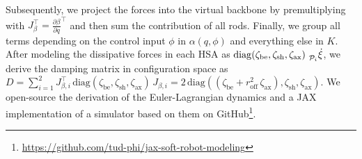 Subsequently, we project the forces into the virtual backbone by premultiplying with $J_\beta^\top = \frac{\partial \beta}{\partial q}^\top$ and then sum the contribution of all rods.
Finally, we group all terms depending on the control input $\phi$ in $\alpha(q,\phi)$ and everything else in $K$.
After modeling the dissipative forces in each \gls{HSA} as $\mathrm{diag}(\zeta_\mathrm{be}, \zeta_{\mathrm{sh}}, \zeta_{\mathrm{ax}}) \, \prescript{}{\mathcal{P}_i}{\dot{\xi}}$, we derive the damping matrix in configuration space as $D = \sum_{i=1}^{2} J_{\beta,i}^\top \, \mathrm{diag}(\zeta_\mathrm{be}, \zeta_{\mathrm{sh}}, \zeta_{\mathrm{ax}}) \, J_{\beta,i} = 2 \, \mathrm{diag}\left ( (\zeta_\mathrm{be} + r_\mathrm{off}^2 \, \zeta_\mathrm{ax} ), \zeta_{\mathrm{sh}}, \zeta_{\mathrm{ax}} \right)$.
We open-source the derivation of the Euler-Lagrangian dynamics and a JAX implementation of a simulator based on them on GitHub\footnote{\url{https://github.com/tud-phi/jax-soft-robot-modeling}}.

